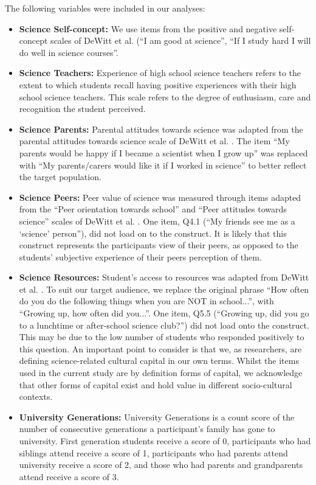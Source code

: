 \documentclass[smallextended]{svjour3}       %
\begin{document}
The following variables were included in our analyses:
\begin{itemize}
    \item \textbf{Science Self-concept:} We use items from the positive and negative self-concept scales of DeWitt et al. \citeyear{dewitt2011high} (``I am good at science'', ``If I study hard I will do well in science courses''.   
    \item \textbf{Science Teachers:} Experience of high school science teachers refers to the extent to which students recall having positive experiences with their high school science teachers. This scale refers to the degree of enthusiasm, care and recognition the student perceived. 
    \item \textbf{Science Parents:} Parental attitudes towards science was adapted from the parental attitudes towards science scale of DeWitt et al. \citeyear{dewitt2011high}. The item ``My parents would be happy if I became a scientist when I grow up'' was replaced with ``My parents/carers would like it if I worked in science'' to better reflect the target population.
    \item \textbf{Science Peers:} Peer value of science was measured through items adapted from the ``Peer orientation towards school'' and ``Peer attitudes towards science'' scales of DeWitt et al. \citeyear{dewitt2011high}. One item, Q4.1 (``My friends see me as a `science' person''), did not load on to the construct. It is likely that this construct represents the participants view of their peers, as opposed to the students' subjective experience of their peers perception of them.
    \item \textbf{Science Resources:} Student's access to resources was adapted from DeWitt et al. \citeyear{dewitt2011high}. To suit our target audience, we replace the original phrase ``How often do you do the following things when you are NOT in school...'', with ``Growing up, how often did you...''. One item, Q5.5 (``Growing up, did you go to a lunchtime or after-school science club?'') did not load onto the construct. This may be due to the low number of students who responded positively to this question. An important point to consider is that we, as researchers, are defining science-related cultural capital in our own terms. Whilst the items used in the current study are by definition forms of capital, we acknowledge that other forms of capital exist and hold value in different socio-cultural contexts.
    \item \textbf{University Generations:} University Generations is a count score of the number of consecutive generations a participant's family has gone to university. First generation students receive a score of 0,  participants who had siblings attend receive a score of 1, participants who had parents attend university receive a score of 2, and those who had parents and grandparents attend receive a score of 3.

\end{itemize}
\end{document}
